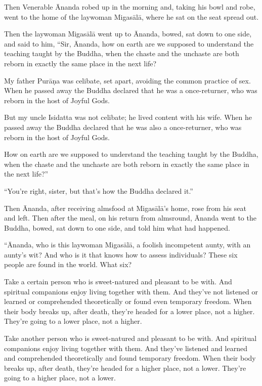 \documentclass[12pt,openany]{book}%
\begin{document}
Then Venerable Ānanda robed up in the morning and, taking his bowl and robe, went to the home of the laywoman \textsanskrit{Migasālā}, where he sat on the seat spread out. 

Then the laywoman \textsanskrit{Migasālā} went up to Ānanda, bowed, sat down to one side, and said to him, “Sir, Ānanda, how on earth are we supposed to understand the teaching taught by the Buddha, when the chaste and the unchaste are both reborn in exactly the same place in the next life? 

My father \textsanskrit{Purāṇa} was celibate, set apart, avoiding the common practice of sex. When he passed away the Buddha declared that he was a once-returner, who was reborn in the host of Joyful Gods. 

But my uncle Isidatta was not celibate; he lived content with his wife. When he passed away the Buddha declared that he was also a once-returner, who was reborn in the host of Joyful Gods. 

How on earth are we supposed to understand the teaching taught by the Buddha, when the chaste and the unchaste are both reborn in exactly the same place in the next life?” 

“You’re right, sister, but that’s how the Buddha declared it.” 

Then Ānanda, after receiving almsfood at \textsanskrit{Migasālā}’s home, rose from his seat and left. Then after the meal, on his return from almsround, Ānanda went to the Buddha, bowed, sat down to one side, and told him what had happened. 

“Ānanda, who is this laywoman \textsanskrit{Migasālā}, a foolish incompetent aunty, with an aunty’s wit? And who is it that knows how to assess individuals? These six people are found in the world. What six? 

Take a certain person who is sweet-natured and pleasant to be with. And spiritual companions enjoy living together with them. And they’ve not listened or learned or comprehended theoretically or found even temporary freedom. When their body breaks up, after death, they’re headed for a lower place, not a higher. They’re going to a lower place, not a higher. 

Take another person who is sweet-natured and pleasant to be with. And spiritual companions enjoy living together with them. And they’ve listened and learned and comprehended theoretically and found temporary freedom. When their body breaks up, after death, they’re headed for a higher place, not a lower. They’re going to a higher place, not a lower. 
\end{document}
